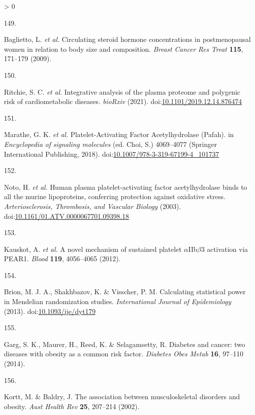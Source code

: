 \documentclass[11pt,twoside]{bristolthesis}
\newlength{\cslhangindent}
\newlength{\csllabelwidth}
\newenvironment{CSLReferences}[2] %
 {%
  \setlength{\parindent}{0pt}
  \ifodd #1 \everypar{\setlength{\hangindent}{\cslhangindent}}\ignorespaces\fi
  \ifnum #2 > 0
  \setlength{\parskip}{#2\baselineskip}
  \fi
 }%
 {}
\newcommand{\CSLLeftMargin}[1]{\parbox[t]{\csllabelwidth}{#1}}
\newcommand{\CSLRightInline}[1]{\parbox[t]{\linewidth - \csllabelwidth}{#1}\break}
\begin{document}
\begin{CSLReferences}{0}{0}
\leavevmode\hypertarget{ref-Baglietto2009}{}%
\CSLLeftMargin{149. }
\CSLRightInline{Baglietto, L. \emph{et al.} {Circulating steroid hormone concentrations in postmenopausal women in relation to body size and composition}. \emph{Breast Cancer Res Treat} \textbf{115}, 171--179 (2009).}

\leavevmode\hypertarget{ref-Ritchie2019}{}%
\CSLLeftMargin{150. }
\CSLRightInline{Ritchie, S. C. \emph{et al.} {Integrative analysis of the plasma proteome and polygenic risk of cardiometabolic diseases}. \emph{bioRxiv} (2021). doi:\href{https://doi.org/10.1101/2019.12.14.876474}{10.1101/2019.12.14.876474}}

\leavevmode\hypertarget{ref-Marathe2018}{}%
\CSLLeftMargin{151. }
\CSLRightInline{Marathe, G. K. \emph{et al.} {Platelet-Activating Factor Acetylhydrolase (Pafah)}. in \emph{Encyclopedia of signaling molecules} (ed. Choi, S.) 4069--4077 (Springer International Publishing, 2018). doi:\href{https://doi.org/10.1007/978-3-319-67199-4_101737}{10.1007/978-3-319-67199-4\_101737}}

\leavevmode\hypertarget{ref-Noto2003}{}%
\CSLLeftMargin{152. }
\CSLRightInline{Noto, H. \emph{et al.} {Human plasma platelet-activating factor acetylhydrolase binds to all the murine lipoproteins, conferring protection against oxidative stress}. \emph{Arteriosclerosis, Thrombosis, and Vascular Biology} (2003). doi:\href{https://doi.org/10.1161/01.ATV.0000067701.09398.18}{10.1161/01.ATV.0000067701.09398.18}}

\leavevmode\hypertarget{ref-Kauskot2012}{}%
\CSLLeftMargin{153. }
\CSLRightInline{Kauskot, A. \emph{et al.} {A novel mechanism of sustained platelet \(\alpha\)IIb\(\beta\)3 activation via PEAR1.} \emph{Blood} \textbf{119}, 4056--4065 (2012).}

\leavevmode\hypertarget{ref-Brion2013}{}%
\CSLLeftMargin{154. }
\CSLRightInline{Brion, M. J. A., Shakhbazov, K. \& Visscher, P. M. {Calculating statistical power in Mendelian randomization studies}. \emph{International Journal of Epidemiology} (2013). doi:\href{https://doi.org/10.1093/ije/dyt179}{10.1093/ije/dyt179}}

\leavevmode\hypertarget{ref-Garg2014}{}%
\CSLLeftMargin{155. }
\CSLRightInline{Garg, S. K., Maurer, H., Reed, K. \& Selagamsetty, R. {Diabetes and cancer: two diseases with obesity as a common risk factor}. \emph{Diabetes Obes Metab} \textbf{16}, 97--110 (2014).}

\leavevmode\hypertarget{ref-Kortt2002}{}%
\CSLLeftMargin{156. }
\CSLRightInline{Kortt, M. \& Baldry, J. {The association between musculoskeletal disorders and obesity}. \emph{Aust Health Rev} \textbf{25}, 207--214 (2002).}


\end{CSLReferences}
\end{document}
